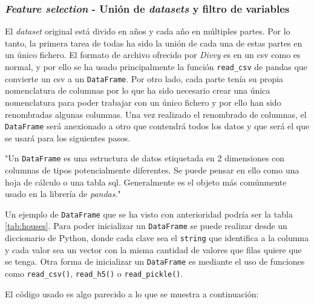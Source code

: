 \subsubsection{\textit{Feature selection} - Unión de \textit{datasets} y filtro de variables}\label{feature-selection}

El \textit{dataset} original \cite{divvy} está divido en años y cada año en múltiples partes. Por lo tanto, la primera tarea de todas ha sido la unión de cada una de estas partes en un único fichero. El formato de archivo ofrecido por \textit{Divvy} es en un \acrshort{csv} como es normal, y por ello se ha usado principalmente la función \verb|read_csv| de pandas que convierte un \acrshort{csv} a un \verb|DataFrame|. Por otro lado, cada parte tenía su propia nomenclatura de columnas por lo que ha sido necesario crear una única nomenclatura para poder trabajar con un único fichero y por ello han sido renombradas algunas columnas. Una vez realizado el renombrado de columnas, el \verb|DataFrame| será anexionado a otro que contendrá todos los datos y que será el que se usará para los siguientes pasos.

\begin{displayquote}
"Un \verb|DataFrame| es una estructura de datos etiquetada en 2 dimensiones con columnas de tipos potencialmente diferentes. Se puede pensar en ello como una hoja de cálculo o una tabla \acrshort{sql}. Generalmente es el objeto más comúnmente usado en la librería de \textit{pandas}." \cite{pandas}
\end{displayquote}

Un ejemplo de \verb|DataFrame| que se ha visto con anterioridad podría ser la tabla \ref{tab:houses}. Para poder inicializar un \verb|DataFrame| se puede realizar desde un diccionario de Python, donde cada clave sea el \verb|string| que identifica a la columna y cada valor sea un vector con la misma cantidad de valores que filas quiere que se tenga. Otra forma de inicializar un \verb|DataFrame| es mediante el uso de funciones como \verb|read_csv()|, \verb|read_h5()| o \verb|read_pickle()|.
\newline

El código usado es algo parecido a lo que se muestra a continuación:

